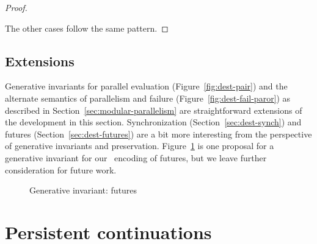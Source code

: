 \begin{proof}
\begin{description}
\medskip

\end{description}

\noindent
The other cases follow the same pattern.
\end{proof}

\subsection{Extensions}

Generative invariants for parallel evaluation
(Figure~\ref{fig:dest-pair}) and the alternate semantics of
parallelism and failure (Figure~\ref{fig:dest-fail-paror}) as
described in Section~\ref{sec:modular-parallelism} are straightforward
extensions of the development in this section.  Synchronization
(Section~\ref{sec:dest-synch}) and futures
(Section~\ref{sec:dest-futures}) are a bit more interesting from the
perspective of generative invariants and preservation.
Figure~\ref{fig:gen-future} is one proposal for a generative
invariant for our \sls~encoding of futures, but we leave further
consideration for future work.

\begin{figure}[tp]
\caption{Generative invariant: futures}
\label{fig:gen-future} 
\end{figure}




\section{Persistent continuations}
\label{sec:gen-letcc}

